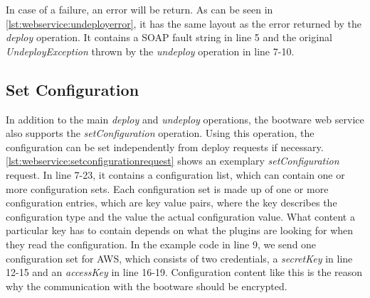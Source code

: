 \vspace*{\baselineskip}

In case of a failure, an error will be return.
As can be seen in \autoref{lst:webservice:undeployerror}, it has the same layout as the error returned by the \textit{deploy} operation.
It contains a SOAP fault string in line 5 and the original \textit{UndeployException} thrown by the \textit{undeploy} operation in line 7-10.

\vspace*{\baselineskip}

\subsection{Set Configuration}

In addition to the main \textit{deploy} and \textit{undeploy} operations, the bootware web service also supports the \textit{setConfiguration} operation.
Using this operation, the configuration can be set independently from deploy requests if necessary.
\autoref{lst:webservice:setconfigurationrequest} shows an exemplary \textit{setConfiguration} request.
In line 7-23, it contains a configuration list, which can contain one or more configuration sets.
Each configuration set is made up of one or more configuration entries, which are key value pairs, where the key describes the configuration type and the value the actual configuration value.
What content a particular key has to contain depends on what the plugins are looking for when they read the configuration.
In the example code in line 9, we send one configuration set for AWS, which consists of two credentials, a \textit{secretKey} in line 12-15 and an \textit{accessKey} in line 16-19.
Configuration content like this is the reason why the communication with the bootware should be encrypted.


